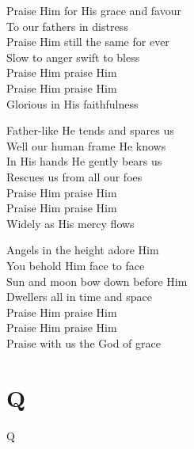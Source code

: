 \documentclass{beamer}
\begin{document}
{\begin{frame}{}
Praise Him for His grace and favour\\ 
To our fathers in distress\\ 
Praise Him still the same for ever\\ 
Slow to anger swift to bless\\ 
Praise Him praise Him\\ 
Praise Him praise Him\\ 
Glorious in His faithfulness 

\end{frame}

\hypertarget{Praise, my soul, the King of heaven[]3}{}
\begin{frame}{}
\fontsize{ 20 }{ 27 }\selectfont

Father-like He tends and spares us\\ 
Well our human frame He knows\\ 
In His hands He gently bears us\\ 
Rescues us from all our foes\\ 
Praise Him praise Him\\ 
Praise Him praise Him\\ 
Widely as His mercy flows 

\end{frame}

\hypertarget{Praise, my soul, the King of heaven[]4}{}
\begin{frame}{}
\fontsize{ 20 }{ 27 }\selectfont

Angels in the height adore Him\\ 
You behold Him face to face\\ 
Sun and moon bow down before Him\\ 
Dwellers all in time and space\\ 
Praise Him praise Him\\ 
Praise Him praise Him\\ 
Praise with us the God of grace 

\end{frame}

}
\section{Q}

\begin{frame}[t]{Q}
\begin{columns}[t]

    


    


\end{columns}

\end{frame}
\end{document}
